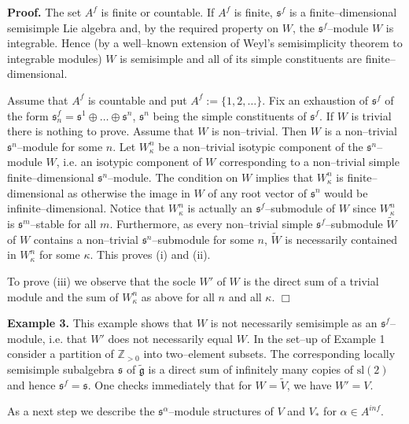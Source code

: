 \documentclass[oneside,leqno,12pt]{article}
\newcounter{theorem}
\newenvironment{proof}{ \noindent \textbf{Proof.}}{\hfill $\Box$}
\def\gg{\mathfrak{g}}
\def\gs{\mathfrak{s}}
\def\Z{\mathbb{Z}}
\renewcommand{\ss}{\mathfrak{s}}
\renewcommand{\gg}{\mathfrak{g}}
\renewcommand{\sl}{\mathrm{sl}}
\begin{document}
\begin{proof}
The set $A^f$ is finite or countable. If $A^f$ is finite, $\ss^f$ is a finite--dimensional semisimple Lie algebra and, by the required property on $W$, the 
$\ss^f$--module $W$ is integrable.  Hence (by a well--known extension of Weyl's semisimplicity theorem to integrable modules) $W$ is semisimple and 
all of its simple constituents are finite--dimensional. 

Assume that $A^f$ is countable and put $A^f:=\{1,2,\dots\}$. Fix an exhaustion of $\ss^f$ of the form $\ss_n^f=\ss^1\oplus\dots\oplus\ss^n$, $\ss^n$ being the simple constituents of $\ss^f$. 
If $W$ is trivial there is nothing to prove. Assume that $W$ is non--trivial. Then $W$ is a non--trivial $\gs^n$--module for some $n$.
Let $W_\kappa^n$ be a non--trivial  isotypic component  of the $\gs^n$--module $W$, i.e. an isotypic component of $W$ 
corresponding to a non--trivial simple finite--dimensional  $\gs^n$--module.
The condition on $W$ implies that $W_\kappa^n$
is finite--dimensional as otherwise the image in $W$ of any root vector of $\gs^n$ would be infinite--dimensional.
Notice that $W_\kappa^n$ is actually an $\gs^f$--submodule of $W$ since $W_\kappa^n$ is $\gs^m$--stable for all $m$. 
Furthermore, as every non--trivial simple $\gs^f$--submodule $\tilde{W}$ of $W$ contains a non--trivial $\gs^n$--submodule for
some $n$, $\tilde{W}$ is necessarily contained in $W_\kappa^n$ for some $\kappa$. This proves (i) and (ii). 

To prove (iii) we observe that the socle $W'$ of $W$ is the direct sum of a trivial module and the sum of $W_\kappa^n$ as above for all $n$ and all $\kappa$.
\end{proof}

\medskip

\noindent\textbf{Example 3.} This example shows that $W$ is not necessarily semisimple as an $\ss^f$--module, 
i.e. that $W'$ does not necessarily equal $W$. In the set--up of Example 1 consider a partition of $\Z_{>0}$ into two--element subsets.
The corresponding locally semisimple subalgebra $\gs$ of $\tilde{\gg}$ is a direct sum of infinitely many copies of $\sl(2)$ and hence $\gs^f = \gs$. 
One checks immediately that  for $W = \tilde{V}$, we have $W' = V$.



As a next step we describe the $\ss^\alpha$--module structures of $V$ and $V_*$ for $\alpha\in A^{inf}$.
\end{document}

